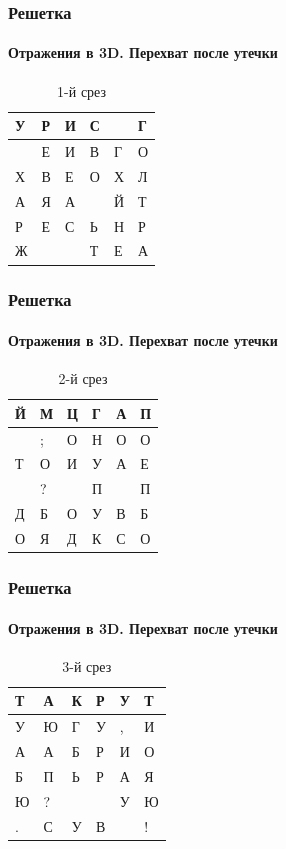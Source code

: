 \begin{frame}[fragile]
    \frametitle{Решетка}
    \framesubtitle{Отражения в 3D. Перехват после утечки}
    
    \begin{table}[ht]
        \caption{1-й срез}
        \centering
        \begin{tabular}[c]{|l|l|l|l|l|l|}
            \hline
            У&Р&И&С& &Г\\ \hline
             &Е&И&В&Г&О\\ \hline
            Х&В&Е&О&Х&Л\\ \hline
            А&Я&А& &Й&Т\\ \hline
            Р&Е&С&Ь&Н&Р\\ \hline
            Ж& & &Т&Е&А\\ \hline
        \end{tabular}
    \end{table}
\end{frame}


\begin{frame}[fragile]
    \frametitle{Решетка}
    \framesubtitle{Отражения в 3D. Перехват после утечки}
    
    \begin{table}[ht]
        \caption{2-й срез}
        \centering
        \begin{tabular}[c]{|l|l|l|l|l|l|}
            \hline
            Й&М&Ц&Г&А&П\\ \hline
             &;&О&Н&О&О\\ \hline
            Т&О&И&У&А&Е\\ \hline
             &?& &П& &П\\ \hline
            Д&Б&О&У&В&Б\\ \hline
            О&Я&Д&К&С&О\\ \hline
        \end{tabular}
    \end{table}
\end{frame}


\begin{frame}[fragile]
    \frametitle{Решетка}
    \framesubtitle{Отражения в 3D. Перехват после утечки}
    
    \begin{table}[ht]
        \caption{3-й срез}
        \centering
        \begin{tabular}[c]{|l|l|l|l|l|l|}
            \hline
            Т&А&К&Р&У&Т\\ \hline
            У&Ю&Г&У&,&И\\ \hline
            А&А&Б&Р&И&О\\ \hline
            Б&П&Ь&Р&А&Я\\ \hline
            Ю&?& & &У&Ю\\ \hline
            .&С&У&В& &!\\ \hline
        \end{tabular}
    \end{table}
\end{frame}


